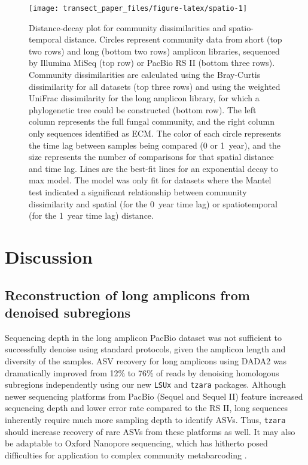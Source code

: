 \documentclass[
  12pt,
]{article}
\begin{document}
\begin{figure}

{\centering \texttt{[image: transect\_paper\_files/figure-latex/spatio-1]} 

}

\caption[Distance-decay plot for community dissimilarities and spatio-temporal distance]{Distance-decay plot for community dissimilarities and spatio-temporal distance. Circles represent community data from short (top two rows) and long (bottom two rows) amplicon libraries, sequenced by Illumina MiSeq (top row) or PacBio RS II (bottom three rows).
Community dissimilarities are calculated using the Bray-Curtis dissimilarity for all datasets (top three rows) and using the weighted UniFrac dissimilarity for the long amplicon library, for which a phylogenetic tree could be constructed (bottom row).
The left column represents the full fungal community, and the right column only sequences identified as ECM.
The color of each circle represents the time lag between samples being compared (0 or 1~year), and the size represents the number of comparisons for that spatial distance and time lag.
Lines are the best-fit lines for an exponential decay to max model.
The model was only fit for datasets where the Mantel test indicated a significant relationship between community dissimilarity and spatial (for the 0~year time lag) or spatiotemporal (for the 1~year time lag) distance.}\label{fig:spatio}
\end{figure}

\hypertarget{discussion}{%
\section{Discussion}\label{discussion}}

\hypertarget{reconstruction-of-long-amplicons-from-denoised-subregions}{%
\subsection{Reconstruction of long amplicons from denoised subregions}\label{reconstruction-of-long-amplicons-from-denoised-subregions}}

Sequencing depth in the long amplicon PacBio dataset was not sufficient to successfully denoise using standard protocols, given the amplicon length and diversity of the samples.
ASV recovery for long amplicons using DADA2 was dramatically improved from 12\% to 76\% of reads by denoising homologous subregions independently using our new \texttt{LSUx} and \texttt{tzara} packages.
Although newer sequencing platforms from PacBio (Sequel and Sequel II) feature increased sequencing depth and lower error rate compared to the RS II, long sequences inherently require much more sampling depth to identify ASVs.
Thus, \texttt{tzara} should increase recovery of rare ASVs from these platforms as well.
It may also be adaptable to Oxford Nanopore sequencing, which has hitherto posed difficulties for application to complex community metabarcoding \autocite{loit2019}.
\end{document}
